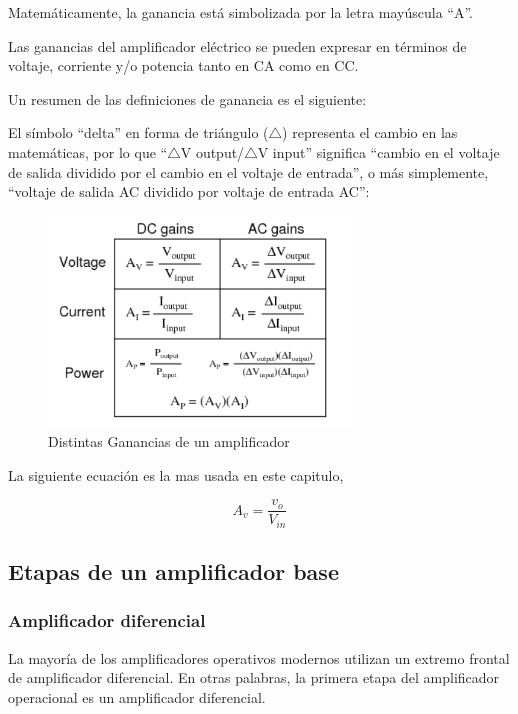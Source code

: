 Matemáticamente, la ganancia está simbolizada por la letra mayúscula “A”.

Las ganancias del amplificador eléctrico se pueden expresar en términos de voltaje, corriente y/o potencia tanto en CA como en CC.

Un resumen de las definiciones de ganancia es el siguiente:

El símbolo “delta” en forma de triángulo ($\triangle$) representa el cambio en las matemáticas, por lo que “$\triangle$V output/$\triangle$V input” significa “cambio en el voltaje de salida dividido por el cambio en el voltaje de entrada”, o más simplemente, “voltaje de salida AC dividido por voltaje de entrada AC”:

\begin{figure}[H]
    \centering
    \includegraphics[width=8cm]{Imagenes/gain_amp.png}
    \caption{Distintas Ganancias de un amplificador}
    \label{fig:gain_amp}
\end{figure}

La siguiente ecuación es la mas usada en este capitulo,

\begin{equation}
    A_v=\dfrac{v_o}{V_{in}}
    \label{eqn:av}
\end{equation}





\subsection{Etapas de un amplificador base}
\subsubsection{Amplificador diferencial}
La mayoría de los amplificadores operativos modernos utilizan un extremo frontal de amplificador diferencial. En otras palabras, la primera etapa del amplificador operacional es un amplificador diferencial.

